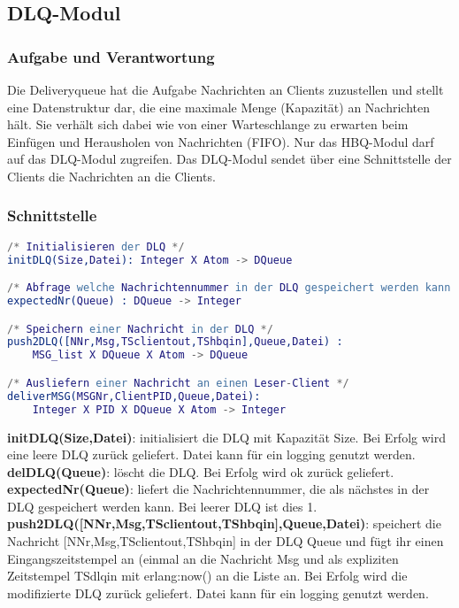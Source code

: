 \documentclass{article}
\begin{document}
\subsection{DLQ-Modul}
\subsubsection{Aufgabe und Verantwortung}
Die Deliveryqueue hat die Aufgabe Nachrichten an Clients zuzustellen und stellt eine Datenstruktur dar, die eine maximale Menge (Kapazität) an Nachrichten hält. Sie verhält sich dabei wie von einer Warteschlange zu erwarten beim Einfügen und Herausholen von Nachrichten (FIFO). Nur das HBQ-Modul darf auf das DLQ-Modul zugreifen. Das DLQ-Modul sendet über eine Schnittstelle der Clients die Nachrichten an die Clients.

\subsubsection{Schnittstelle}
\begin{lstlisting}[language=erlang]
/* Initialisieren der DLQ */
initDLQ(Size,Datei): Integer X Atom -> DQueue

/* Abfrage welche Nachrichtennummer in der DLQ gespeichert werden kann */
expectedNr(Queue) : DQueue -> Integer

/* Speichern einer Nachricht in der DLQ */
push2DLQ([NNr,Msg,TSclientout,TShbqin],Queue,Datei) :
    MSG_list X DQueue X Atom -> DQueue

/* Ausliefern einer Nachricht an einen Leser-Client */
deliverMSG(MSGNr,ClientPID,Queue,Datei):
    Integer X PID X DQueue X Atom -> Integer
\end{lstlisting}

\textbf{initDLQ(Size,Datei)}: initialisiert die DLQ mit Kapazität Size. Bei Erfolg wird eine leere DLQ zurück geliefert. Datei kann für ein logging genutzt werden.\\

\textbf{delDLQ(Queue)}: löscht die DLQ. Bei Erfolg wird ok zurück geliefert.\\

\textbf{expectedNr(Queue)}: liefert die Nachrichtennummer, die als nächstes in der DLQ gespeichert werden kann. Bei leerer DLQ ist dies 1.\\

\textbf{push2DLQ([NNr,Msg,TSclientout,TShbqin],Queue,Datei)}: speichert die Nachricht [NNr,Msg,TSclientout,TShbqin] in der DLQ Queue und fügt ihr einen Eingangszeitstempel an (einmal an die Nachricht Msg und als expliziten Zeitstempel TSdlqin mit erlang:now() an die Liste an. Bei Erfolg wird die modifizierte DLQ zurück geliefert. Datei kann für ein logging genutzt werden.\\
\end{document}
